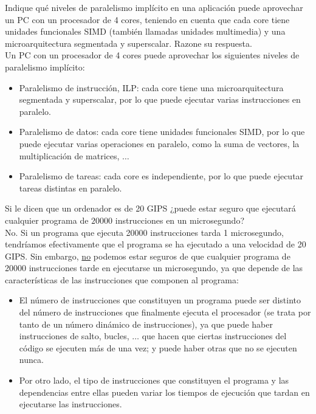 \begin{cuestion}
    Indique qué niveles de paralelismo implícito en una aplicación puede aprovechar un PC con un
    procesador de 4 cores, teniendo en cuenta que cada core tiene unidades funcionales SIMD (también
    llamadas unidades multimedia) y una microarquitectura segmentada y superscalar. Razone su respuesta.\\

    Un PC con un procesador de 4 cores puede aprovechar los siguientes niveles de paralelismo implícito:
    \begin{itemize}
        \item Paralelismo de instrucción, ILP: cada core tiene una microarquitectura segmentada y superscalar, por lo que puede ejecutar varias instrucciones en paralelo.
        \item Paralelismo de datos: cada core tiene unidades funcionales SIMD, por lo que puede ejecutar varias operaciones en paralelo, como la suma de vectores, la multiplicación de matrices, $\ldots$
        \item Paralelismo de tareas: cada core es independiente, por lo que puede ejecutar tareas distintas en paralelo.
    \end{itemize}
\end{cuestion}

\begin{cuestion}
    Si le dicen que un ordenador es de 20 GIPS ¿puede estar seguro que ejecutará cualquier
    programa de $20000$ instrucciones en un microsegundo?\\

    No. Si un programa que ejecuta 20000 instrucciones tarda 1 microsegundo,
    tendríamos efectivamente que el programa se ha ejecutado a una velocidad de 20 GIPS.
    Sin embargo, \ul{no} podemos estar seguros de que cualquier programa de 20000
    instrucciones tarde en ejecutarse un microsegundo, ya que depende de las
    características de las instrucciones que componen al programa:
    \begin{itemize}
        \item El número de instrucciones que constituyen un programa puede ser distinto del número de instrucciones que finalmente ejecuta el procesador (se trata por tanto de un número dinámico de instrucciones), ya que puede haber instrucciones de salto, bucles, $\ldots$ que hacen que ciertas instrucciones del código se ejecuten más de una vez; y puede haber otras que no se ejecuten nunca.
        \item Por otro lado, el tipo de instrucciones que constituyen el programa y las dependencias entre ellas pueden variar los tiempos de ejecución que tardan en ejecutarse las instrucciones.
    \end{itemize}
\end{cuestion}

